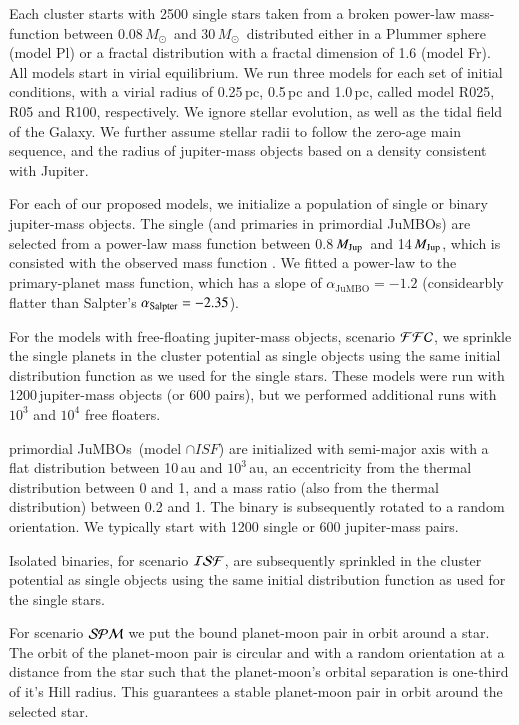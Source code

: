 \documentclass[aa]{lib/aa}
\newcommand{\MSun}{\mbox{${M}_\odot$}}
\newcommand{\MJup}{\mbox{${M}_{\rm Jup}$}}
\newcommand{\jumbo}{\mbox{JuMBO}}
\newcommand{\jumbos}{\mbox{JuMBOs}}
\begin{document}
Each cluster starts with 2500 single stars taken from a broken
power-law mass-function \citep{2002Sci...295...82K} between
0.08\,\MSun\, and $30$\,\MSun\, distributed either in a Plummer sphere
(model Pl) or a fractal distribution with a fractal dimension of 1.6
(model Fr). All models start in virial equilibrium.  We run three
models for each set of initial conditions, with a virial radius of
0.25\,pc, 0.5\,pc and 1.0\,pc, called model R025, R05 and R100,
respectively.  We ignore stellar evolution, as well as the tidal field
of the Galaxy. We further assume stellar radii to follow the zero-age
main sequence, and the radius of jupiter-mass objects based on a
density consistent with Jupiter.

For each of our proposed models, we initialize a population of single
or binary jupiter-mass objects. The single (and primaries in
primordial \jumbos) are selected from a power-law mass function between
0.8\,\MJup\, and 14\,\MJup, which is consisted with the observed mass
function \citep{2023arXiv231001231P}. We fitted a power-law to the
primary-planet mass function, which has a slope of $\alpha_{\jumbo}
=-1.2$ (considearbly flatter than Salpter's $\alpha_{\rm Salpter} =
-2.35$).

For the models with free-floating jupiter-mass objects, scenario
${\cal FFC}$, we sprinkle the single planets in the cluster potential
as single objects using the same initial distribution function as we
used for the single stars.  These models were run with
1200\,jupiter-mass objects (or 600 pairs), but we performed additional
runs with $10^3$ and $10^4$ free floaters.

primordial \jumbos\, (model ${\cap ISF}$) are initialized with
semi-major axis with a flat distribution between 10\,au and
$10^3$\,au, an eccentricity from the thermal distribution between 0
and 1, and a mass ratio (also from the thermal distribution) between
0.2 and 1.  The binary is subsequently rotated to a random
orientation. We typically start with 1200 single or 600 jupiter-mass
pairs.

Isolated binaries, for scenario ${\cal ISF}$, are subsequently
sprinkled in the cluster potential as single objects using the same
initial distribution function as used for the single stars.

For scenario ${\cal SPM}$ we put the bound planet-moon pair in orbit
around a star.  The orbit of the planet-moon pair is circular and with
a random orientation at a distance from the star such that the
planet-moon's orbital separation is one-third of it's Hill radius.
This guarantees a stable planet-moon pair in orbit around the selected
star.
\end{document}

